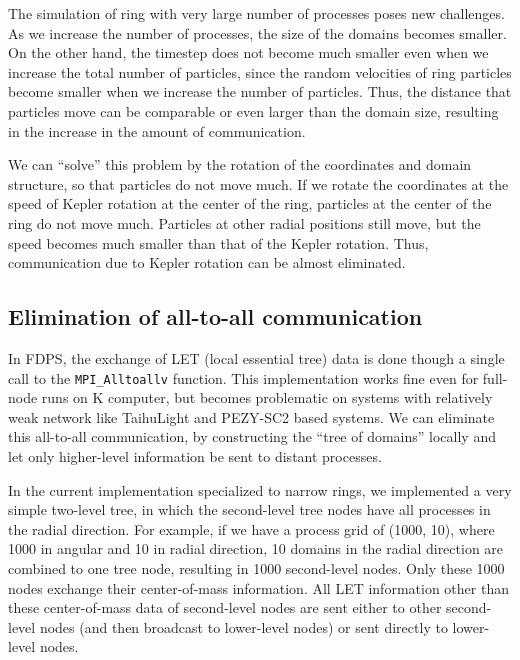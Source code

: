 \documentclass[conference]{IEEEtran}
\begin{document}
The simulation of ring with very large number of processes poses
new challenges. As we increase the number of processes, the size of
the domains becomes smaller. On the other hand, the timestep does not
become much smaller even when we increase the total number of
particles, since the random velocities of ring particles become
smaller when we increase the number of particles. Thus, the distance
that particles move can be comparable or even larger than the domain
size, resulting in the increase in the amount of  communication.

We can ``solve'' this problem by the rotation of  the coordinates and domain
structure, so that particles do not move much. If we rotate the
coordinates at the speed of Kepler rotation at the center of the ring,
particles at the center of the ring do not move much. Particles at
other radial positions still move, but the speed becomes much smaller
than that of the Kepler rotation. Thus, communication due to Kepler
rotation can be almost eliminated.


\subsection{Elimination of all-to-all communication}
\label{subsec:exlet}



In FDPS, the exchange of LET (local essential tree) data is done
though a single call to the {\tt MPI\_Alltoallv} function.  This
implementation works fine even for full-node runs on K computer, but
becomes problematic on systems with relatively weak network like
TaihuLight and PEZY-SC2 based systems. We can eliminate this all-to-all communication, by
constructing the ``tree of domains'' locally and let only higher-level
information be sent to distant processes.

In the current implementation specialized to narrow rings, we
implemented a very simple two-level tree, in which the second-level
tree nodes have all processes in the radial direction. For example, if we
have a process grid of (1000, 10), where 1000 in angular and 10 in
radial direction, 10 domains in the radial direction are combined to
one tree node, resulting in 1000 second-level nodes. Only these 1000
nodes exchange their center-of-mass information. All LET information
other than these center-of-mass data of second-level nodes are sent
either to other second-level nodes (and then broadcast to
lower-level nodes) or sent directly to lower-level nodes.
\end{document}
